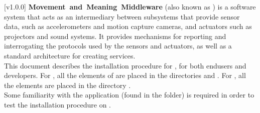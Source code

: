 [v1.0.0]
\textbf{Movement~and~Meaning~Middleware} (also known as \mplusm) is a software system
that acts as an intermediary between subsystems that provide sensor data, such as
accelerometers and motion capture cameras, and actuators such as projectors and sound
systems.
It provides mechanisms for reporting and interrogating the protocols used by the sensors
and actuators, as well as a standard architecture for creating services.\\

This document describes the installation procedure for \mplusm, for both
end\longDash{}users and developers.
For \osx, all the elements of \mplusm{} are placed in the directories 
and .
For \win, all the elements are placed in the directory
.\\

Some familiarity with the  application (found in the
 folder) is required in order to test the installation
procedure on \osx.
\primaryEnd{}
